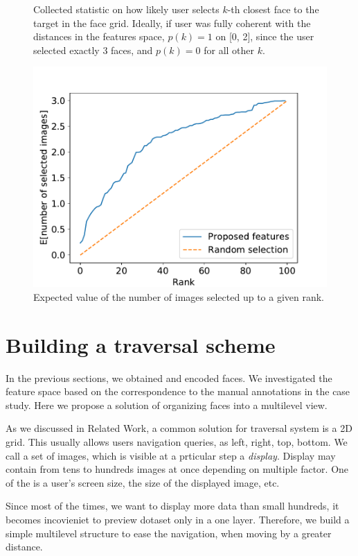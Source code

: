\begin{figure}
    \caption{Collected statistic on how likely user selects $k$-th closest face to the target in the face grid. Ideally, if user was fully coherent with the distances in the features space, $p(k) = 1$ on [0, 2], since the user selected exactly 3 faces, and $p(k) = 0$ for all other $k$.}
    \label{fig:survey_distribution}
\end{figure}


\begin{figure}
    \centering
    \includegraphics[width=0.8\linewidth]{graphs/survey_cumsum_without_the_easy.pdf}
    \caption{Expected value of the number of images selected up to a given rank.}
    \label{fig:my_label}
\end{figure}

\section{Building a traversal scheme}

In the previous sections, we obtained and encoded faces. We investigated the feature space based on the correspondence to the manual annotations in the case study. Here we propose a solution of organizing faces into a multilevel view. 

As we discussed in Related Work, a common solution for traversal system is a 2D grid. This usually allows users navigation queries, as left, right, top, bottom. We call a set of images, which is visible at a prticular step a \emph{display}. Display may contain from tens to hundreds images at once depending on multiple factor. One of the is a user's screen size, the size of the displayed image, etc.

Since most of the times, we want to display more data than small hundreds, it becomes incovieniet to preview dotaset only in a one layer. Therefore, we build a simple multilevel structure to ease the navigation, when moving by a greater distance.

